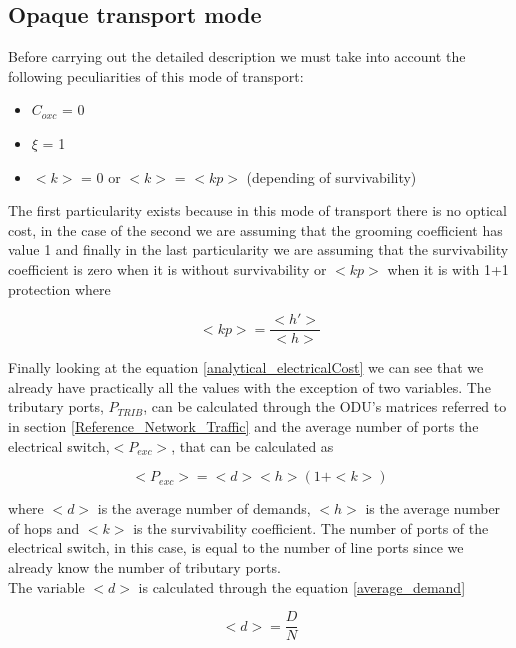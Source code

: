 \clearpage

\subsection{Opaque transport mode}\label{analytical_Opaque_Mode}

Before carrying out the detailed description we must take into account the following peculiarities of this mode of transport:
\begin{itemize}
  \item $C_{oxc}$ = 0
  \item $\xi$ = 1
  \item $<k>$ = 0 or $<k>$ = $<kp>$ (depending of survivability)
\end{itemize}

The first particularity exists because in this mode of transport there is no optical cost, in the case of the second we are assuming that the grooming coefficient has value 1 and finally in the last particularity we are assuming that the survivability coefficient is zero when it is without survivability or $<kp>$ when it is with 1+1 protection where

\begin{equation}
<kp> = \frac{<h'>}{<h>}
\label{coefficient_protec}
\end{equation}

\vspace{13pt}
Finally looking at the equation \ref{analytical_electricalCost} we can see that we already have practically all the values with the exception of two variables. The tributary ports, $P_{TRIB}$, can be calculated through the ODU's matrices referred to in section \ref{Reference_Network_Traffic} and the average number of ports the electrical switch,$<P_{exc}>$, that can be calculated as

\begin{equation}
<P_{exc}> = <d> <h> \left(1 + <k>\right)
\label{Pexc_opaque}
\end{equation}

\noindent
where $<d>$ is the average number of demands, $<h>$ is the average number of hops and $<k>$	is the survivability coefficient. The number of ports of the electrical switch, in this case, is equal to the number of line ports since we already know the number of tributary ports.\\
The variable $<d>$ is calculated through the equation \ref{average_demand}

\begin{equation}
<d> = \frac{D}{N}
\label{average_demand}
\end{equation}
